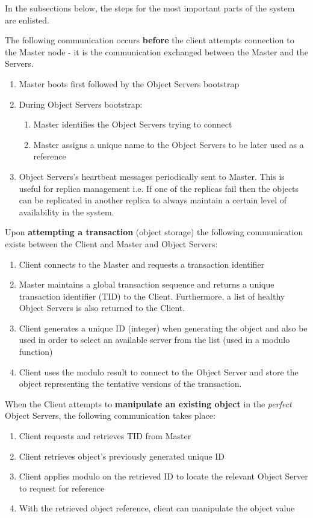 \documentclass[times, 10pt,twocolumn]{article}
\begin{document}
\label{sec:algor}
In the subsections below, the steps for the most important parts of the system are enlisted.

The following communication occurs {\bf before} the client attempts connection to the Master node - it is the communication exchanged between the Master and the Servers.
\begin{enumerate}
\item Master boots first followed by the Object Servers bootstrap
\item During Object Servers bootstrap:
\begin{enumerate}
\item Master identifies the Object Servers trying to connect
\item Master assigns a unique name to the Object Servers to be later used as a reference
\end{enumerate}
\item Object Servers's heartbeat messages periodically sent to Master. This is useful for replica management i.e. If one of the replicas fail then the objects can be replicated in another replica to always maintain a certain level of availability in the system.
\end{enumerate}

Upon {\bf attempting a transaction} (object storage) the following communication exists between the Client and Master and Object Servers: 
\begin{enumerate}
\item Client connects to the Master and requests a transaction identifier 
\item Master maintains a global transaction sequence and returns a unique transaction identifier (TID) to the Client. Furthermore, a list of healthy Object Servers is also returned to the Client. 
\item Client generates a unique ID (integer) when generating the object and also be used in order to select an available server from the list (used in a modulo function)
\item Client uses the modulo result to connect to the Object Server and store the object representing the tentative versions of the transaction.
\end{enumerate}

When the Client attempts to {\bf manipulate an existing object} in the {\it perfect} Object Servers, the following communication takes place:
\begin{enumerate}
\item Client requests and retrieves TID from Master
\item Client retrieves object's previously generated unique ID
\item Client applies modulo on the retrieved ID to locate the relevant Object Server to request for reference
\item With the retrieved object reference, client can manipulate the object value
\end{enumerate}
\end{document}
